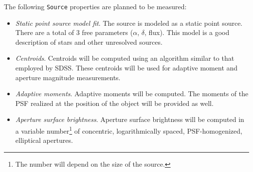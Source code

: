 \documentclass[12pt]{article}
\newcommand{\code}[1]{\texttt{#1}}
\newcommand{\Source}{\code{Source}\xspace}
\begin{document}
The following \Source properties are planned to be measured:
%
\begin{itemize}
    \item {\em Static point source model fit}. The source is modeled as a static point source. There are a total of 3 free parameters ($\alpha$, $\delta$, flux). This model is a good description of stars and other unresolved sources.

    \item {\em Centroids}. Centroids will be computed using an algorithm similar to that employed by SDSS. These centroids will be used for adaptive moment and aperture magnitude measurements.

    \item {\em Adaptive moments}. Adaptive moments will be computed. The moments of the PSF realized at the position of the object will be provided as well.


    \item {\em Aperture surface brightness}. Aperture surface brightness will be computed in a variable number\footnote{The number will depend on the size of the source.} of concentric, logarithmically spaced, PSF-homogenized, elliptical apertures.


\end{itemize}
\end{document}
